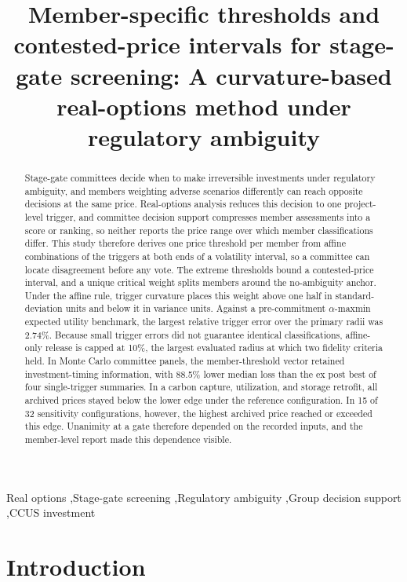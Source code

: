 \begin{frontmatter}

\title{Member-specific thresholds and contested-price intervals for stage-gate screening: A curvature-based real-options method under regulatory ambiguity}

\begin{abstract}
Stage-gate committees decide when to make irreversible investments under regulatory ambiguity, and members weighting adverse scenarios differently can reach opposite decisions at the same price. Real-options analysis reduces this decision to one project-level trigger, and committee decision support compresses member assessments into a score or ranking, so neither reports the price range over which member classifications differ. This study therefore derives one price threshold per member from affine combinations of the triggers at both ends of a volatility interval, so a committee can locate disagreement before any vote. The extreme thresholds bound a contested-price interval, and a unique critical weight splits members around the no-ambiguity anchor. Under the affine rule, trigger curvature places this weight above one half in standard-deviation units and below it in variance units. Against a pre-commitment $\alpha$-maxmin expected utility benchmark, the largest relative trigger error over the primary radii was 2.74\%. Because small trigger errors did not guarantee identical classifications, affine-only release is capped at 10\%, the largest evaluated radius at which two fidelity criteria held. In Monte Carlo committee panels, the member-threshold vector retained investment-timing information, with 88.5\% lower median loss than the ex post best of four single-trigger summaries. In a carbon capture, utilization, and storage retrofit, all archived prices stayed below the lower edge under the reference configuration. In 15 of 32 sensitivity configurations, however, the highest archived price reached or exceeded this edge. Unanimity at a gate therefore depended on the recorded inputs, and the member-level report made this dependence visible.
\end{abstract}

\begin{keyword}
Real options \sep Stage-gate screening \sep Regulatory ambiguity \sep Group decision support \sep CCUS investment
\end{keyword}

\end{frontmatter}

\section{Introduction}

